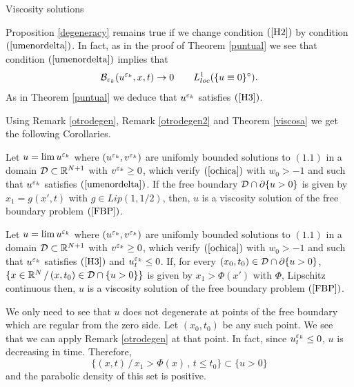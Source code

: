 \begin{section}{Viscosity solutions}
\begin{rem}
\label{otrodegen2}
Proposition \ref{degeneracy} remains true if we change
condition $(\ref{H2})$ by condition $(\ref{umenordelta})$. In fact,
as in the proof of Theorem \ref{puntual} we see that condition 
$(\ref{umenordelta})$ implies that 
$$
{\cal B}_{{\varepsilon_k}}(u^{\varepsilon_k}, x,t)\to0\qquad L^1_{loc}(\{u\equiv0\}^\circ).
$$
As in Theorem \ref{puntual} we deduce that $u^{\varepsilon_k}$ satisfies $(\ref{H3})$.

\end{rem}

\bigskip


Using  Remark \ref{otrodegen}, Remark \ref{otrodegen2} and Theorem \ref{viscosa}
 we get the following
Corollaries.




\begin{cor}
\label{cor1}
Let $u=\lim u^{\varepsilon_k}$ where $(u^{\varepsilon_k},v^{\varepsilon_k})$ are unifomly bounded
solutions to $(1.1)$ in a domain ${\cal D}\subset{\Bbb R}^{N+1}$ with $v^{\varepsilon_k}\ge0$,
which verify $(\ref{ochica})$ with $w_0>-1$ and such that 
$u^{\varepsilon_k}$ satisfies $(\ref{umenordelta})$.
If the free
boundary ${\cal D}\cap\partial\{u>0\}$ is given by $x_1 = g(x',t)$ with
$g\in Lip(1,1/2)$, then, $u$ is a 
viscosity solution of the free boundary problem $(\ref{FBP})$.
\end{cor}




\begin{cor}
\label{cor0}
Let $u=\lim u^{\varepsilon_k}$ where $(u^{\varepsilon_k},v^{\varepsilon_k})$ are unifomly bounded
solutions to $(1.1)$ in a domain ${\cal D}\subset{\Bbb R}^{N+1}$ with $v^{\varepsilon_k}\ge0$,
which verify $(\ref{ochica})$ with $w_0>-1$ and such that $u^{\varepsilon_k}$ 
satisfies $(\ref{H3})$ and $u^{\varepsilon_k}_t\le 0$.
If, for every $(x_0,t_0)\in {\cal D}\cap\partial\{u>0\}$,  
$\{x\in {\Bbb R}^N\,/\, (x,t_0)\in {\cal D}\cap\{u>0\}\}$ is given by 
$x_1>\Phi(x')$ with
$\Phi$, Lipschitz continuous  then, $u$ is a 
viscosity solution of the free boundary problem $(\ref{FBP})$.
\end{cor}
\begin{pf} We only need to see that $u$ does not degenerate at points
of the free boundary which are regular from the zero side. Let $(x_0,t_0)$ be
any such point. We see that
we can apply Remark \ref{otrodegen} at that point. In fact, since $u^{\varepsilon_k}_t
\le0$, $u$ is decreasing in time. Therefore,
$$
\{(x,t)\,/\,x_1>\Phi(x)\,,\,t\le t_0\}\subset\{u>0\}
$$  
and the parabolic density of this set is positive.
\end{pf}




\end{section}
